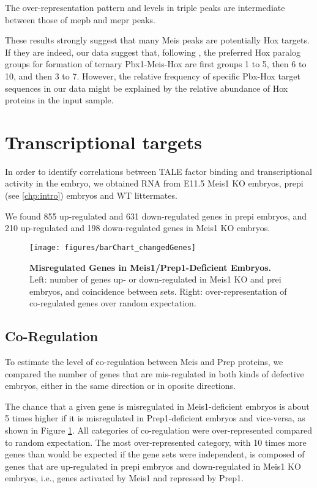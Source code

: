 The over-representation pattern and levels in triple peaks are intermediate between those of \ac{mepb} and \ac{mepr} peaks. 

These results strongly suggest that many Meis peaks are potentially Hox targets. If they are indeed, our data suggest that, following \cite{Shen1997}, the preferred Hox paralog groups for formation of ternary Pbx1-Meis-Hox are first groups 1 to 5, then 6 to 10, and then 3 to 7. However, the relative frequency of specific Pbx-Hox target sequences in our data might be explained by the relative abundance of Hox proteins in the input sample.


\section{Transcriptional targets}

In order to identify correlations between \ac{TALE} factor binding and transcriptional activity in the embryo, we obtained RNA from E11.5 Meis1 \ac{KO} embryos, \ac{prepi} (see \ref{chp:intro}) embryos and \ac{WT} littermates. 

We found 855 up-regulated and 631 down-regulated genes in \ac{prepi} embryos, and 210 up-regulated and 198 down-regulated genes in Meis1 \ac{KO} embryos. 

\begin{figure}[]
  \centering
  \texttt{[image: figures/barChart\_changedGenes]}
  \caption[Misregulated Genes in Meis1/Prep1-Deficient Embryos]{\textbf{Misregulated Genes in Meis1/Prep1-Deficient Embryos.} Left: number of genes up- or down-regulated in Meis1 \ac{KO} and \ac{prei} embryos, and coincidence between sets. Right: over-representation of co-regulated genes over random expectation.}
  \label{fig:changedGenes}
\end{figure}

\subsection{Co-Regulation}

To estimate the level of co-regulation between Meis and Prep proteins, we compared the number of genes that are mis-regulated in both kinds of defective embryos, either in the same direction or in oposite directions. 

The chance that a given gene is misregulated in Meis1-deficient embryos is about 5 times higher if it is misregulated in Prep1-deficient embryos and vice-versa, as shown in Figure \ref{fig:changedGenes}. All categories of co-regulation were over-represented compared to random expectation. The most over-represented category, with 10 times more genes than would be expected if the gene sets were independent, is composed of genes that are up-regulated in \ac{prepi} embryos and down-regulated in Meis1 \ac{KO} embryos, i.e., genes activated by Meis1 and repressed by Prep1.


